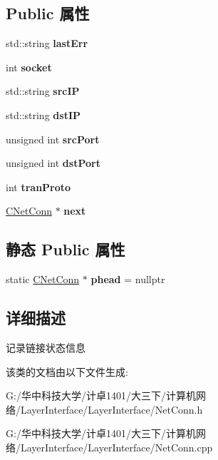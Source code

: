 \subsection*{Public 属性}
\begin{DoxyCompactItemize}
\item 
\mbox{\label{class_c_net_conn_af403a1097dad68c834126c515fa76893}} 
std\+::string {\bfseries last\+Err}
\item 
\mbox{\label{class_c_net_conn_a622ed64d7d62629e8ac33b1d2d0c70bc}} 
int {\bfseries socket}
\item 
\mbox{\label{class_c_net_conn_ab811fe46f1f54064735438c119df692e}} 
std\+::string {\bfseries src\+IP}
\item 
\mbox{\label{class_c_net_conn_a29e8c336b1ebcdec3d1867d2c8667d88}} 
std\+::string {\bfseries dst\+IP}
\item 
\mbox{\label{class_c_net_conn_a01763de4d43bf8f45022ad549141ec2b}} 
unsigned int {\bfseries src\+Port}
\item 
\mbox{\label{class_c_net_conn_a3ba6e293a471292e135c20706d388b9c}} 
unsigned int {\bfseries dst\+Port}
\item 
\mbox{\label{class_c_net_conn_a887c118d2000cf8bd230a8f09579b7b7}} 
int {\bfseries tran\+Proto}
\item 
\mbox{\label{class_c_net_conn_af2958082fddd86589edf11785ccc8231}} 
\hyperlink{class_c_net_conn}{C\+Net\+Conn} $\ast$ {\bfseries next}
\end{DoxyCompactItemize}
\subsection*{静态 Public 属性}
\begin{DoxyCompactItemize}
\item 
\mbox{\label{class_c_net_conn_a4d52e492a5ac410d6bf6bb0c7d2df5a9}} 
static \hyperlink{class_c_net_conn}{C\+Net\+Conn} $\ast$ {\bfseries phead} = nullptr
\end{DoxyCompactItemize}


\subsection{详细描述}
记录链接状态信息 

该类的文档由以下文件生成\+:\begin{DoxyCompactItemize}
\item 
G\+:/华中科技大学/计卓1401/大三下/计算机网络/\+Layer\+Interface/\+Layer\+Interface/Net\+Conn.\+h\item 
G\+:/华中科技大学/计卓1401/大三下/计算机网络/\+Layer\+Interface/\+Layer\+Interface/Net\+Conn.\+cpp\end{DoxyCompactItemize}
